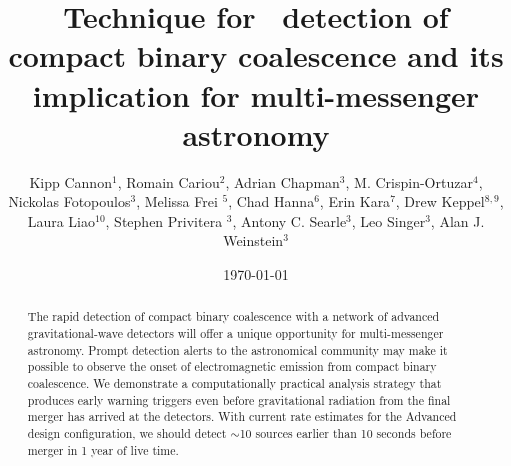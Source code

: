 \documentclass[showpacs,groupedaddress,showkeys,preprintnumbers]{iopart}
\begin{document}
\title[LLOID]{Technique for \earlywarning\ detection of compact binary coalescence and its implication for multi-messenger astronomy}

\date{\today}

\author{Kipp Cannon$^{1}$, Romain Cariou$^{2}$, Adrian Chapman$^3$, M.
Crispin-Ortuzar$^4$, Nickolas Fotopoulos$^3$, Melissa Frei $^5$, Chad
Hanna$^{6}$, Erin Kara$^{7}$, Drew Keppel$^{8,9}$, Laura Liao$^{10}$, Stephen
Privitera $^3$, Antony C.  Searle$^3$, Leo Singer$^3$, Alan J.  Weinstein$^3$}

\address{$^1$ Canadian Institute for Theoretical Astrophysics, Toronto, ON,
Canada}
\address{$^2$  D\'{e}partement de physique, \'{E}cole Normale Sup\'{e}rieure de Cachan, 61
Avenue du Pr\'{e}sident Wilson, 94235 Cachan Cedex, France}
\address{$^3$ LIGO Laboratory - California Institute of Technology, Pasadena,
CA, USA} 
\address{$^4$ Facultat de F\'{i}sica, Universitat de Val\`{e}ncia, E-46100 Burjassot,
Spain} 
\address{$^5$ The University of Texas at Austin, Austin, TX, USA}
\address{$^6$ Perimeter Institute for Theoretical Physics, Waterloo, ON,
Canada} 
\address{$^7$ Department of Physics and Astronomy, Barnard College, Columbia
University, New York, NY 10027, USA} 
\address{$^8$ Albert-Einstein-Institut, Max-Planck-Institut f\"{u}r
Gravitationphysik, Hannover, Germany} 
\address{$^9$ Leibniz Universit\"{a}t Hannover, Hannover, Germany}
\address{$^{10}$ Ryerson University, Toronto, ON, Canada}

\begin{abstract}
The rapid detection of compact binary coalescence with a network of advanced
gravitational-wave detectors will offer a unique opportunity for multi-messenger astronomy.  Prompt detection alerts to the astronomical community may make it possible to observe the onset of electromagnetic emission from compact binary coalescence.  We demonstrate a computationally practical analysis strategy that produces early warning triggers even before gravitational radiation from the final merger has arrived at the detectors.  With current rate estimates for the Advanced \LIGO{} design configuration, we should detect $\sim$10 sources earlier than 10 seconds before merger in 1 year of live time.
\end{abstract}




\end{document}
